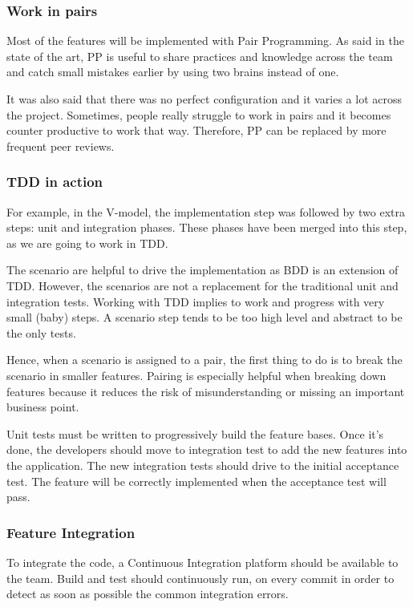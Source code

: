 \subsubsection{Work in pairs}
Most of the features will be implemented with Pair Programming.
As said in the state of the art, PP is useful to share practices and
knowledge across the team and catch small mistakes earlier by using two
brains instead of one.

It was also said that there was no perfect configuration and it varies a lot
across the project.
Sometimes, people really struggle to work in pairs and it becomes counter
productive to work that way.
Therefore, PP can be replaced by more frequent peer reviews.

\subsubsection{TDD in action}
For example, in the V-model, the implementation step was followed by two extra
steps: unit and integration phases.
These phases have been merged into this step, as we are going to work
in TDD\@.

The scenario are helpful to drive the implementation as BDD is an extension of
TDD\@.
However, the scenarios are not a replacement for the traditional unit and
integration tests.
Working with TDD implies to work and progress with very small (baby) steps.
A scenario step tends to be too high level and abstract to be the only tests.

Hence, when a scenario is assigned to a pair, the first thing to do is to
break the scenario in smaller features.
Pairing is especially helpful when breaking down features because it reduces
the risk of misunderstanding or missing an important business point.

Unit tests must be written to progressively build the feature bases.
Once it's done, the developers should move to integration test to add the new
features into the application.
The new integration tests should drive to the initial acceptance test.
The feature will be correctly implemented when the acceptance test will
pass.

\subsubsection{Feature Integration}
To integrate the code, a Continuous Integration platform should be available
to the team.
Build and test should continuously run, on every commit in order to detect as
soon as possible the common integration errors.

